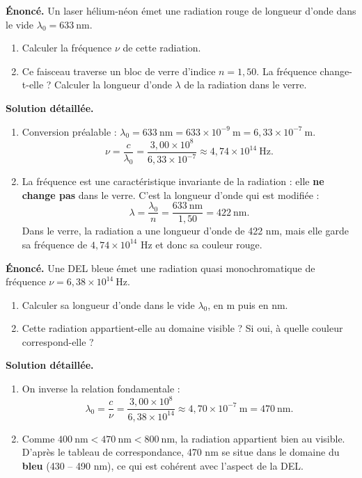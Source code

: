 \documentclass[11pt]{article}
\newcounter{popsec}
\newcounter{popsub}
\newcommand{\courssub}[1]{%
  \stepcounter{popsub}%
  \par\vspace{9pt}\noindent{\popxbold\fontsize{11.5}{13}\selectfont\color{popink}{\color{poporange}\thepopsec.\thepopsub}\hspace{6pt}#1}\par\nopagebreak\vspace{4pt}
}
\begin{document}
\courssub{Exercices résolus}

\begin{exoresolu}
\textbf{Énoncé.} Un laser hélium-néon émet une radiation rouge de longueur d'onde dans le vide $\lambda_0 = 633\ \text{nm}$.
\begin{enumerate}
\item Calculer la fréquence $\nu$ de cette radiation.
\item Ce faisceau traverse un bloc de verre d'indice $n = 1{,}50$. La fréquence change-t-elle ? Calculer la longueur d'onde $\lambda$ de la radiation dans le verre.
\end{enumerate}
\tcblower
\textbf{Solution détaillée.}
\begin{enumerate}
\item Conversion préalable : $\lambda_0 = 633\ \text{nm} = 633 \times 10^{-9}\ \text{m} = 6{,}33 \times 10^{-7}\ \text{m}$.
\[ \nu = \dfrac{c}{\lambda_0} = \dfrac{3{,}00 \times 10^{8}}{6{,}33 \times 10^{-7}} \approx 4{,}74 \times 10^{14}\ \text{Hz}. \]
\item La fréquence est une caractéristique invariante de la radiation : elle \textbf{ne change pas} dans le verre. C'est la longueur d'onde qui est modifiée :
\[ \lambda = \dfrac{\lambda_0}{n} = \dfrac{633\ \text{nm}}{1{,}50} = 422\ \text{nm}. \]
Dans le verre, la radiation a une longueur d'onde de 422 nm, mais elle garde sa fréquence de $4{,}74 \times 10^{14}$ Hz et donc sa couleur rouge.
\end{enumerate}
\end{exoresolu}

\begin{exoresolu}
\textbf{Énoncé.} Une DEL bleue émet une radiation quasi monochromatique de fréquence $\nu = 6{,}38 \times 10^{14}\ \text{Hz}$.
\begin{enumerate}
\item Calculer sa longueur d'onde dans le vide $\lambda_0$, en m puis en nm.
\item Cette radiation appartient-elle au domaine visible ? Si oui, à quelle couleur correspond-elle ?
\end{enumerate}
\tcblower
\textbf{Solution détaillée.}
\begin{enumerate}
\item On inverse la relation fondamentale :
\[ \lambda_0 = \dfrac{c}{\nu} = \dfrac{3{,}00 \times 10^{8}}{6{,}38 \times 10^{14}} \approx 4{,}70 \times 10^{-7}\ \text{m} = 470\ \text{nm}. \]
\item Comme $400\ \text{nm} < 470\ \text{nm} < 800\ \text{nm}$, la radiation appartient bien au visible. D'après le tableau de correspondance, 470 nm se situe dans le domaine du \textbf{bleu} (430 -- 490 nm), ce qui est cohérent avec l'aspect de la DEL.
\end{enumerate}
\end{exoresolu}
\end{document}
